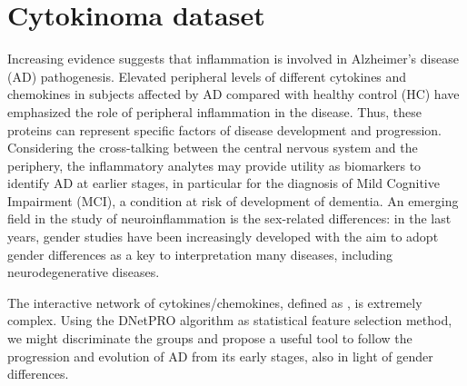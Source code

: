 \documentclass{standalone}
\begin{document}
\section[Cytokinoma Dataset]{Cytokinoma dataset}\label{cytokine}

Increasing evidence suggests that inflammation is involved in Alzheimer's disease (AD) pathogenesis.
Elevated peripheral levels of different cytokines and chemokines in subjects affected by AD compared with healthy control (HC) have emphasized the role of peripheral inflammation in the disease.
Thus, these proteins can represent specific factors of disease development and progression.
Considering the cross-talking between the central nervous system and the periphery, the inflammatory analytes may provide utility as biomarkers to identify AD at earlier stages, in particular for the diagnosis of Mild Cognitive Impairment (MCI), a condition at risk of development of dementia.
An emerging field in the study of neuroinflammation is the sex-related differences: in the last years, gender studies have been increasingly developed with the aim to adopt gender differences as a key to interpretation many diseases, including neurodegenerative diseases.

The interactive network of cytokines/chemokines, defined as , is extremely complex.
Using the DNetPRO algorithm as statistical feature selection method, we might discriminate the groups and propose a useful tool to follow the progression and evolution of AD from its early stages, also in light of gender differences.
\end{document}
